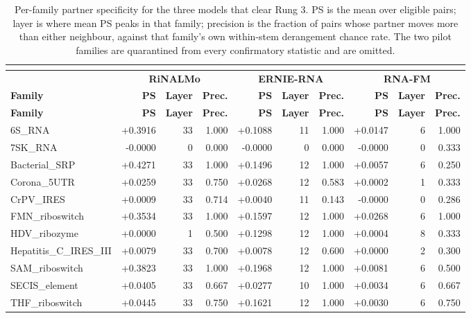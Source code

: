 \small
\begin{longtable}{@{}lrrrrrrrrr@{}}
\caption{Per-family partner specificity for the three models that clear Rung 3. PS is the mean over eligible pairs; layer is where mean PS peaks in that family; precision is the fraction of pairs whose partner moves more than either neighbour, against that family's own within-stem derangement chance rate. The two pilot families are quarantined from every confirmatory statistic and are omitted.}\\
\label{tab:s3}\\
\toprule
 & \multicolumn{3}{c}{\textbf{RiNALMo}} & \multicolumn{3}{c}{\textbf{ERNIE-RNA}} & \multicolumn{3}{c}{\textbf{RNA-FM}} \\
\cmidrule(lr){2-4}\cmidrule(lr){5-7}\cmidrule(lr){8-10}
\textbf{Family} & \textbf{PS} & \textbf{Layer} & \textbf{Prec.} & \textbf{PS} & \textbf{Layer} & \textbf{Prec.} & \textbf{PS} & \textbf{Layer} & \textbf{Prec.} \\
\midrule
\endfirsthead
\toprule
\textbf{Family} & \textbf{PS} & \textbf{Layer} & \textbf{Prec.} & \textbf{PS} & \textbf{Layer} & \textbf{Prec.} & \textbf{PS} & \textbf{Layer} & \textbf{Prec.} \\
\midrule
\endhead
6S\_RNA & +0.3916 & 33 & 1.000 & +0.1088 & 11 & 1.000 & +0.0147 & 6 & 1.000 \\
7SK\_RNA & -0.0000 & 0 & 0.000 & -0.0000 & 0 & 0.000 & -0.0000 & 0 & 0.333 \\
Bacterial\_SRP & +0.4271 & 33 & 1.000 & +0.1496 & 12 & 1.000 & +0.0057 & 6 & 0.250 \\
Corona\_5UTR & +0.0259 & 33 & 0.750 & +0.0268 & 12 & 0.583 & +0.0002 & 1 & 0.333 \\
CrPV\_IRES & +0.0009 & 33 & 0.714 & +0.0040 & 11 & 0.143 & -0.0000 & 0 & 0.286 \\
FMN\_riboswitch & +0.3534 & 33 & 1.000 & +0.1597 & 12 & 1.000 & +0.0268 & 6 & 1.000 \\
HDV\_ribozyme & +0.0000 & 1 & 0.500 & +0.1298 & 12 & 1.000 & +0.0004 & 8 & 0.333 \\
Hepatitis\_C\_IRES\_III & +0.0079 & 33 & 0.700 & +0.0078 & 12 & 0.600 & +0.0000 & 2 & 0.300 \\
SAM\_riboswitch & +0.3823 & 33 & 1.000 & +0.1968 & 12 & 1.000 & +0.0081 & 6 & 0.500 \\
SECIS\_element & +0.0405 & 33 & 0.667 & +0.0277 & 10 & 1.000 & +0.0034 & 6 & 0.667 \\
THF\_riboswitch & +0.0445 & 33 & 0.750 & +0.1621 & 12 & 1.000 & +0.0030 & 6 & 0.750 \\

\end{longtable}
